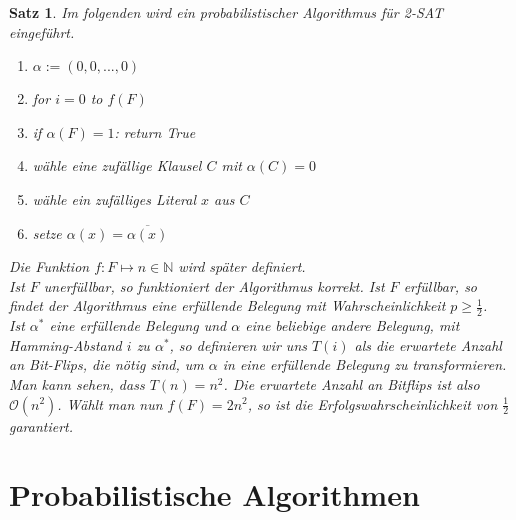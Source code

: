 \documentclass[a4paper, 12pt]{article}
\theoremstyle{plain}
\newtheorem{theorem}{Satz}[section] %
\theoremstyle{definition}
\theoremstyle{lemma}
\theoremstyle{remark}
\theoremstyle{corollary}
\theoremstyle{example}
\begin{document}
	\begin{theorem}
		Im folgenden wird ein probabilistischer Algorithmus für 2-SAT eingeführt.
		\begin{enumerate}
			\item $\alpha := (0,0,...,0)$
			\item for $i = 0$ to $f(F)$
			\item if $\alpha(F) = 1$: return True
			\item wähle eine zufällige Klausel $C$ mit $\alpha(C) = 0$
			\item wähle ein zufälliges Literal $x$ aus $C$
			\item setze $\alpha(x) = \overline{\alpha(x)}$
		\end{enumerate}
		Die Funktion $f: F \mapsto n \in \mathbb{N}$ wird später definiert.\\
		Ist $F$ unerfüllbar, so funktioniert der Algorithmus korrekt. Ist $F$ erfüllbar, so findet der Algorithmus eine erfüllende Belegung mit Wahrscheinlichkeit $p \geq \frac{1}{2}$.\\
		Ist $\alpha^*$ eine erfüllende Belegung und $\alpha$ eine beliebige andere Belegung, mit Hamming-Abstand $i$ zu $\alpha^*$, so definieren wir uns $T(i)$ als die erwartete Anzahl an Bit-Flips, die nötig sind, um $\alpha$ in eine erfüllende Belegung zu transformieren. Man kann sehen, dass $T(n) = n^2$. Die erwartete Anzahl an Bitflips ist also $\mathcal{O}(n^2)$. Wählt man nun $f(F) = 2n^2$, so ist die Erfolgswahrscheinlichkeit von $\frac{1}{2}$ garantiert.
	\end{theorem}
	\section{Probabilistische Algorithmen}
\end{document}
